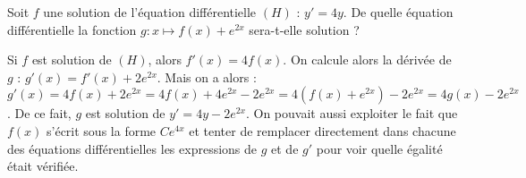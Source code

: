 \begin{question}
Soit $f$ une solution de l'équation différentielle $(H)$ : $y'=4y$. De quelle équation différentielle la fonction $g : x \mapsto f(x)+e^{2x}$ sera-t-elle solution ?
\begin{answers}
\end{answers}
\begin{explanations}
Si $f$ est solution de $(H)$, alors $f'(x)=4f(x)$. On calcule alors la dérivée de $g$ : $g'(x) = f'(x) + 2e^{2x}$. Mais on a alors : $g'(x) = 4f(x) + 2e^{2x} = 4f(x) + 4e^{2x} - 2e^{2x} = 4(f(x)+e^{2x})-2e^{2x} = 4g(x) - 2e^{2x}$. De ce fait, $g$ est solution de $y'=4y-2e^{2x}$. On pouvait aussi exploiter le fait que $f(x)$ s'écrit sous la forme $C e^{4x}$ et tenter de remplacer directement dans chacune des équations différentielles les expressions de $g$ et de $g'$ pour voir quelle égalité était vérifiée.
\end{explanations}
\end{question}


